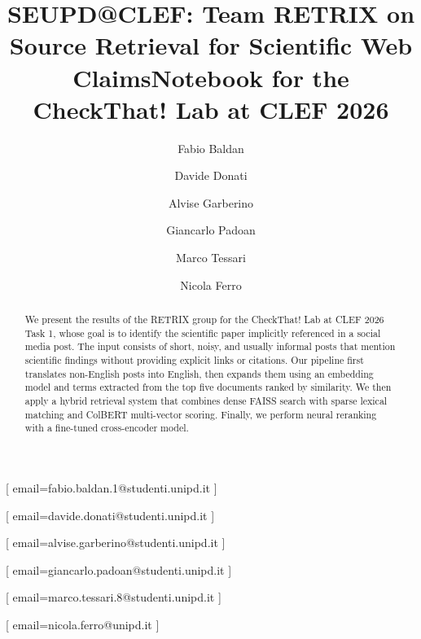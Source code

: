 \documentclass{ceurart}
\begin{document}


  \title{SEUPD@CLEF: Team RETRIX on Source Retrieval for Scientific Web Claims}
  \title[mode=sub]{Notebook for the CheckThat! Lab at CLEF 2026}

  \author[1]{Fabio Baldan}[%
    email=fabio.baldan.1@studenti.unipd.it
  ]
  \cormark[1]

  \author[1]{Davide Donati}[%
    email=davide.donati@studenti.unipd.it
  ]

  \author[1]{Alvise Garberino}[%
    email=alvise.garberino@studenti.unipd.it
  ]

  \author[1]{Giancarlo Padoan}[%
    email=giancarlo.padoan@studenti.unipd.it
  ]

  \author[1]{Marco Tessari}[%
    email=marco.tessari.8@studenti.unipd.it
  ]

  \author[1]{Nicola Ferro}[%
    email=nicola.ferro@unipd.it
  ]

\address[1]{University of Padua, Italy}


  \begin{abstract}
    We present the results of the RETRIX group for the CheckThat! Lab at CLEF 2026 Task 1, whose goal is to identify the scientific paper implicitly referenced in a social media post. The input consists of short, noisy, and usually informal posts that mention scientific findings without providing explicit links or citations. Our pipeline first translates non-English posts into English, then expands them using an embedding model and terms extracted from the top five documents ranked by similarity. We then apply a hybrid retrieval system that combines dense FAISS search with sparse lexical matching and ColBERT multi-vector scoring. Finally, we perform neural reranking with a fine-tuned cross-encoder model.
  \end{abstract}
\end{document}
